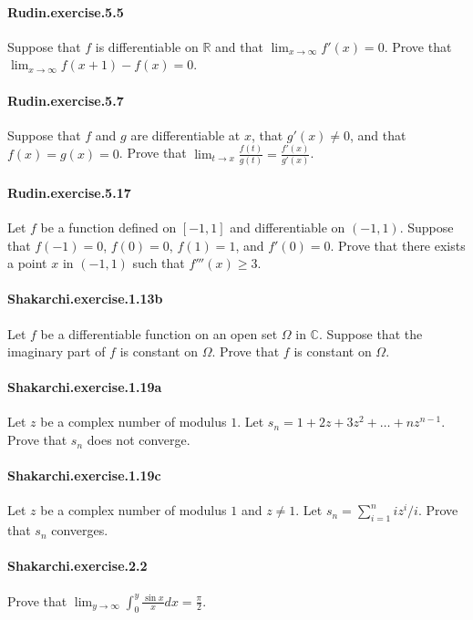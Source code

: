 \documentclass{article}
\begin{document}
\paragraph{Rudin.exercise.5.5} Suppose that $f$ is differentiable on $\mathbb{R}$ and that $\lim_{x\to\infty} f'(x) = 0$. Prove that $\lim_{x\to\infty} f(x+1) - f(x) = 0$.

\paragraph{Rudin.exercise.5.7} Suppose that $f$ and $g$ are differentiable at $x$, that $g'(x)\neq 0$, and that $f(x)=g(x)=0$. Prove that $\lim_{t\to x}\frac{f(t)}{g(t)}=\frac{f'(x)}{g'(x)}$.

\paragraph{Rudin.exercise.5.17} Let $f$ be a function defined on $[-1, 1]$ and differentiable on $(-1, 1)$. Suppose that $f(-1)=0$, $f(0)=0$, $f(1)=1$, and $f'(0)=0$. Prove that there exists a point $x$ in $(-1, 1)$ such that $f'''(x)\geq 3$.

\paragraph{Shakarchi.exercise.1.13b} Let $f$ be a differentiable function on an open set $\Omega$ in $\mathbb{C}$. Suppose that the imaginary part of $f$ is constant on $\Omega$. Prove that $f$ is constant on $\Omega$.

\paragraph{Shakarchi.exercise.1.19a} Let $z$ be a complex number of modulus $1$. Let $s_n = 1 + 2z + 3z^2 + \dots + nz^{n-1}$. Prove that $s_n$ does not converge.

\paragraph{Shakarchi.exercise.1.19c} Let $z$ be a complex number of modulus $1$ and $z\neq 1$. Let $s_n = \sum_{i=1}^n i z^i/i$. Prove that $s_n$ converges.

\paragraph{Shakarchi.exercise.2.2} Prove that $\lim_{y\to\infty} \int_0^y \frac{\sin x}{x} dx = \frac{\pi}{2}$.
\end{document}
